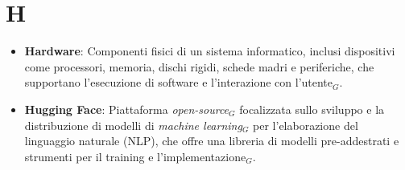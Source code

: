 \section{H}
\begin{itemize}
    \item \textbf{Hardware}: Componenti fisici di un sistema informatico, inclusi dispositivi come processori, memoria, dischi rigidi, schede madri e periferiche, che supportano l'esecuzione di software e l'interazione con l'utente$_G$.
    \item \textbf{Hugging Face}: Piattaforma \textit{open-source}$_G$ focalizzata sullo sviluppo e la distribuzione di modelli di \textit{machine learning}$_G$ per l'elaborazione del linguaggio naturale (NLP), che offre una libreria di modelli pre-addestrati e strumenti per il training e l'implementazione$_G$.
\end{itemize}
